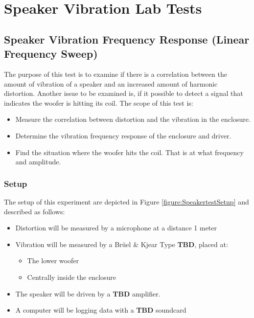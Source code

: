 \chapter{Speaker Vibration Lab Tests} \label{app:journal_speaker_test}

\section{Speaker Vibration Frequency Response (Linear Frequency Sweep)}

The purpose of this test is to examine if there is a correlation between the amount of vibration of a speaker and an increased amount of harmonic distortion. Another issue to be examined is, if it possible to detect a signal that indicates the woofer is hitting its coil. The scope of this test is:



\begin{itemize}
\item Measure the correlation between distortion and the vibration in the enclosure.
\item Determine the vibration frequency response of the enclosure and driver.
\item Find the situation where the woofer hits the coil. That is at what frequency and amplitude.
\end{itemize}

\subsection{Setup}

The setup of this experiment are depicted in Figure \ref{figure:SpeakertestSetup} and described as follows:
\begin{itemize}
\item Distortion will be measured by a microphone at a distance 1 meter
\item Vibration will be measured by a Brüel \& Kjear Type \textbf{TBD}, placed at:
\begin{itemize}
\item The lower woofer
\item Centrally inside the enclosure 
\end{itemize}
\item The speaker will be driven by a \textbf{TBD} amplifier.
\item A computer will be logging data with a \textbf{TBD} soundcard
\end{itemize}

